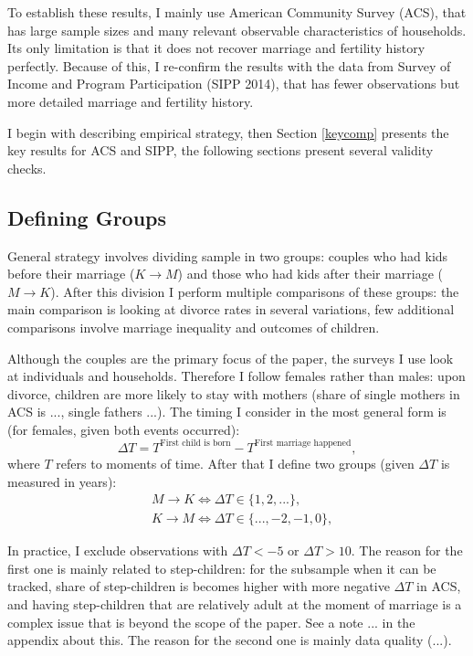 \documentclass[12pt,letter]{article}
\begin{document}
To establish these results, I mainly use American Community Survey (ACS), that has large sample sizes and many relevant observable characteristics of households. Its only limitation is that it does not recover marriage and fertility history perfectly. Because of this, I re-confirm the results with the data from Survey of Income and Program Participation (SIPP 2014), that has fewer observations but more detailed marriage and fertility history.

I begin with describing empirical strategy, then Section \ref{keycomp} presents the key results for ACS and SIPP, the following sections present several validity checks.

\subsection{Defining Groups}

General strategy involves dividing sample in two groups: couples who had kids before their marriage ($K\to M$) and those who had kids after their marriage ($M\to K$). After this division I perform multiple comparisons of these groups: the main comparison is looking at divorce rates in several variations, few additional comparisons involve marriage inequality and outcomes of children.

Although the couples are the primary focus of the paper, the surveys I use look at individuals and households. Therefore I follow females rather than males: upon divorce, children are more likely to stay with mothers (share of single mothers in ACS is ..., single fathers ...). The timing I consider in the  most general form is (for females, given both events occurred): 
\[\Delta T = T^{\text{First child  is born}} - T^{\text{First marriage happened}},\]
where $T$ refers to moments of time. After that I define two groups (given $\Delta T$ is measured in years):
\begin{align*}&M\to K \Leftrightarrow \Delta T \in \{1,2,...\},\\
&K\to M \Leftrightarrow \Delta T \in \{...,-2,-1,0\},\end{align*}

In practice, I exclude observations with $\Delta T < -5$ or $\Delta T > 10$. The reason for the first one is mainly related to step-children: for the subsample when it can be tracked, share of step-children is becomes higher with more negative $\Delta  T$ in ACS, and having step-children that are relatively adult at the moment of marriage is a complex issue that is beyond the scope of the paper. See a note ... in the appendix about this. The reason for the second one is mainly data quality (...).
\end{document}
